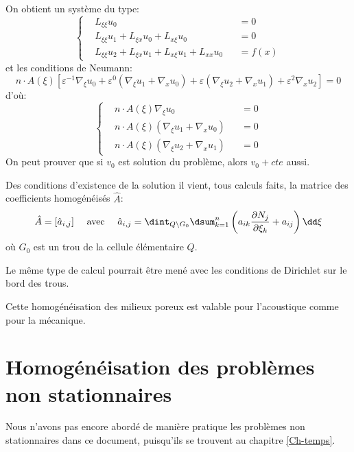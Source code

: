On obtient un système du type:
\begin{equation}\left\{
\begin{aligned}
&L_{\xi\xi} u_0 &&=0\\
&L_{\xi\xi}u_1+L_{\xi x}u_0+L_{x\xi}u_0 &&=0\\
&L_{\xi\xi}u_2+L_{\xi x}u_1+L_{x\xi}u_1 +L_{xx}u_0 &&=f(x)
\end{aligned}
\right. \end{equation}
et les conditions de Neumann:
\begin{equation} n\cdot A(\xi)\left[ \varepsilon^{-1}\nabla_\xi u_0 + \varepsilon^0 (\nabla_\xi u_1+\nabla_x u_0) +
\varepsilon(\nabla_\xi u_2+\nabla_x u_1)+\varepsilon^2\nabla_x u_2
\right]=0 \end{equation}
d'où:
\begin{equation}\left\{
\begin{aligned}
&n\cdot A(\xi)\nabla_\xi u_0 &&=0\\
&n\cdot A(\xi) (\nabla_\xi u_1+\nabla_x u_0) &&=0\\
&n\cdot A(\xi)(\nabla_\xi u_2+\nabla_x u_1) &&=0
\end{aligned}
\right. \end{equation}
On peut prouver que si $v_0$ est solution du problème, alors $v_0+cte$ aussi.

\medskip
Des conditions d'existence de la solution il vient, tous calculs faits, la matrice des
coefficients homogénéisés $\hat{A}$:
\begin{equation} \hat{A} = [\hat{a}_{i,j} ]
\quad \text{ avec }
\quad
\hat{a}_{i,j}=\dint_{Q\backslash G_0} \dsum_{k=1}^n \left(a_{ik} \frac{\partial N_j}{\partial\xi_k} + a_{ij}
\right) \dd\xi
\end{equation}
où $G_0$ est un trou de la cellule élémentaire $Q$.

\medskip
Le même type de calcul pourrait être mené avec les conditions de Dirichlet sur le bord
des trous.

\medskip
Cette homogénéisation des milieux poreux est valable pour l'acoustique comme pour la mécanique.

\medskip
\section{Homogénéisation des problèmes non stationnaires}
Nous n'avons pas encore abordé de manière pratique les problèmes non stationnaires
dans ce document, puisqu'ils se trouvent au chapitre \ref{Ch-temps}.

